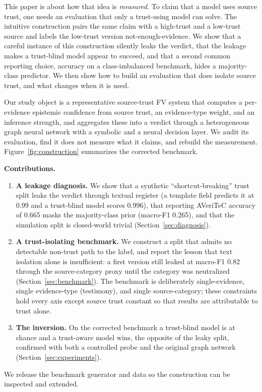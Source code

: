 \documentclass[11pt]{article}
\begin{document}
This paper is about how that idea is \emph{measured}. To claim that a model uses source trust, one needs an evaluation that only a trust-using model can solve. The intuitive construction pairs the same claim with a high-trust and a low-trust source and labels the low-trust version not-enough-evidence. We show that a careful instance of this construction silently leaks the verdict, that the leakage makes a trust-blind model appear to succeed, and that a second common reporting choice, accuracy on a class-imbalanced benchmark, hides a majority-class predictor. We then show how to build an evaluation that does isolate source trust, and what changes when it is used.

Our study object is a representative source-trust FV system that computes a per-evidence epistemic confidence from source trust, an evidence-type weight, and an inference strength, and aggregates these into a verdict through a heterogeneous graph neural network with a symbolic and a neural decision layer. We audit its evaluation, find it does not measure what it claims, and rebuild the measurement. Figure~\ref{fig:construction} summarizes the corrected benchmark.

\textbf{Contributions.}
\begin{enumerate}
\item \textbf{A leakage diagnosis.} We show that a synthetic ``shortcut-breaking'' trust split leaks the verdict through textual register (a template field predicts it at 0.99 and a trust-blind model scores 0.996), that reporting AVeriTeC accuracy of 0.665 masks the majority-class prior (macro-F1 0.265), and that the simulation split is closed-world trivial (Section~\ref{sec:diagnosis}).
\item \textbf{A trust-isolating benchmark.} We construct a split that admits no detectable non-trust path to the label, and report the lesson that text isolation alone is insufficient: a first version still leaked at macro-F1 0.82 through the source-category proxy until the category was neutralized (Section~\ref{sec:benchmark}). The benchmark is deliberately single-evidence, single evidence-type (testimony), and single source-category; these constraints hold every axis except source trust constant so that results are attributable to trust alone.
\item \textbf{The inversion.} On the corrected benchmark a trust-blind model is at chance and a trust-aware model wins, the opposite of the leaky split, confirmed with both a controlled probe and the original graph network (Section~\ref{sec:experiments}).
\end{enumerate}
We release the benchmark generator and data so the construction can be inspected and extended.
\end{document}
